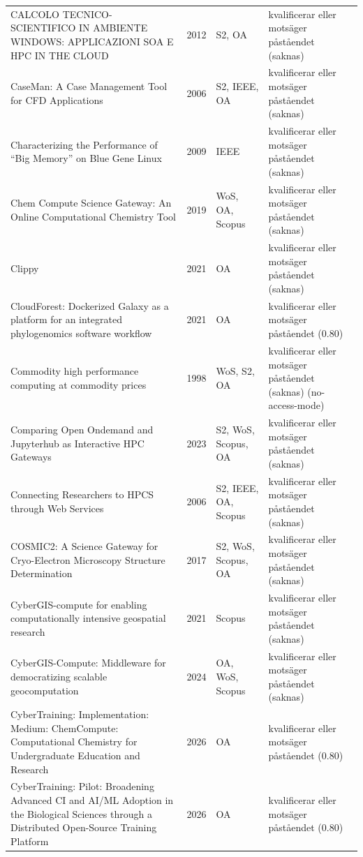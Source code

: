 \begin{longtable}{@{}%
  >{\raggedright\arraybackslash}p{}c%
  >{\raggedright\arraybackslash}p{}%
  >{\raggedright\arraybackslash}p{}@{}}
CALCOLO TECNICO-SCIENTIFICO IN AMBIENTE WINDOWS: APPLICAZIONI SOA E HPC IN THE CLOUD & 2012 & S2, OA & kvalificerar eller motsäger påståendet (saknas) \\
CaseMan: A Case Management Tool for CFD Applications & 2006 & S2, IEEE, OA & kvalificerar eller motsäger påståendet (saknas) \\
Characterizing the Performance of ``Big Memory'' on Blue Gene Linux & 2009 & IEEE & kvalificerar eller motsäger påståendet (saknas) \\
Chem Compute Science Gateway: An Online Computational Chemistry Tool & 2019 & WoS, OA, Scopus & kvalificerar eller motsäger påståendet (saknas) \\
Clippy & 2021 & OA & kvalificerar eller motsäger påståendet (saknas) \\
CloudForest: Dockerized Galaxy as a platform for an integrated phylogenomics software workflow & 2021 & OA & kvalificerar eller motsäger påståendet (0.80) \\
Commodity high performance computing at commodity prices & 1998 & WoS, S2, OA & kvalificerar eller motsäger påståendet (saknas) (no-access-mode) \\
Comparing Open Ondemand and Jupyterhub as Interactive HPC Gateways & 2023 & S2, WoS, Scopus, OA & kvalificerar eller motsäger påståendet (saknas) \\
Connecting Researchers to HPCS through Web Services & 2006 & S2, IEEE, OA, Scopus & kvalificerar eller motsäger påståendet (saknas) \\
COSMIC2: A Science Gateway for Cryo-Electron Microscopy Structure Determination & 2017 & S2, WoS, Scopus, OA & kvalificerar eller motsäger påståendet (saknas) \\
CyberGIS-compute for enabling computationally intensive geospatial research & 2021 & Scopus & kvalificerar eller motsäger påståendet (saknas) \\
CyberGIS-Compute: Middleware for democratizing scalable geocomputation & 2024 & OA, WoS, Scopus & kvalificerar eller motsäger påståendet (saknas) \\
CyberTraining: Implementation: Medium: ChemCompute: Computational Chemistry for Undergraduate Education and Research & 2026 & OA & kvalificerar eller motsäger påståendet (0.80) \\
CyberTraining: Pilot: Broadening Advanced CI and AI/ML Adoption in the Biological Sciences through a Distributed Open-Source Training Platform & 2026 & OA & kvalificerar eller motsäger påståendet (0.80) \\

\end{longtable}
